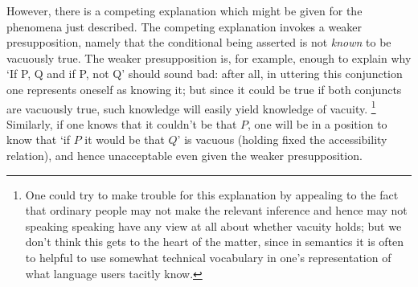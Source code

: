 \documentclass[If.tex]{subfiles}
\begin{document}
However, there is a competing explanation which might be given for the phenomena just described. The competing explanation invokes a weaker presupposition, namely that the conditional being asserted is not \emph{known} to be vacuously true. The weaker presupposition is, for example, enough to explain why ‘If P, Q and if P, not Q’ should sound bad: after all, in uttering this conjunction one represents oneself as knowing it; but since it could be true if both conjuncts are vacuously true, such knowledge will easily yield knowledge of vacuity.%
\footnote{One could try to make trouble for this explanation by appealing to the fact that ordinary people may not make the relevant inference and hence may not speaking speaking have any view at all about whether vacuity holds; but we don't think this gets to the heart of the matter, since in semantics it is often to helpful to use somewhat technical vocabulary in one's representation of what language users tacitly know.}
 Similarly, if one knows that it couldn't be that $P$, one will be in a position to know that ‘if $P$ it would be that $Q$’ is vacuous (holding fixed the accessibility relation), and hence unacceptable even given the weaker presupposition.

\end{document}
